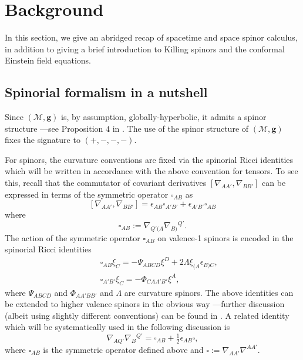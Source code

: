 \documentclass[10pt,a4paper]{article}
\theoremstyle{plain}
\def\bmg{{\bm g}}
\begin{document}
\section{Background}
\label{Background}

In this section, we give an abridged recap of spacetime and space spinor
calculus, in addition to giving a brief introduction to Killing
spinors and the conformal Einstein field equations.

\subsection{Spinorial formalism in a nutshell}
\label{NotationAndSpinorFormalism}

Since $(\mathcal{M}, \bmg)$ is, by assumption, globally-hyperbolic, it
admits a spinor structure ---see Proposition $4$ in
\cite{CFEbook}. The use of the spinor structure of $(\mathcal{M},
\bmg)$ fixes the signature to $(+, -, -, -)$.

\medskip

For spinors, the curvature conventions are fixed via the spinorial
Ricci identities which will be written in accordance with the above
convention for tensors.  To see this, recall that the commutator of
covariant derivatives $[ \nabla_{AA'},\nabla_{BB'}]$ can be expressed
in terms of the symmetric operator $\square_{AB}$ as
\[
[ \nabla_{AA'},\nabla_{BB'}]= \epsilon_{AB}\square_{A'B'} +
\epsilon_{A'B'}\square_{AB}
\]
where
\[
\square_{AB} := \nabla_{Q'(A} \nabla_{B)}{}^{Q'}.
\]
 The action of the symmetric operator $\square_{AB}$ on valence-1
 spinors is encoded in the spinorial Ricci identities
\begin{subequations}
\begin{eqnarray}
&& \square_{AB}\xi_{C}=-\Psi_{ABCD} \xi^{D} +
  2\Lambda\xi_{(A}\epsilon_{B)C},
 \label{SpinorialRicciIdentities1} \\
&& \square_{A'B'}\xi_{C}=-\Phi_{CA A' B'}\xi^{A},
\label{SpinorialRicciIdentities2}
\end{eqnarray}
\end{subequations}
where $\Psi_{ABCD}$ and $\Phi_{AA'BB'}$ and $\Lambda$ are curvature
spinors.  The above identities can be extended to higher valence
spinors in the obvious way ---further discussion (albeit using
slightly different conventions) can be found in \cite{Ste91}. A
related identity which will be systematically used in the following
discussion is
\begin{equation}\label{DecomposeDoubleDerivativeContracted}
\nabla_{AQ'}\nabla_{B}{}^{Q'}=\square_{AB}+
\tfrac{1}{2}\epsilon_{AB}\square,
\end{equation}
where $\square_{AB}$ is the symmetric operator defined above and
$\square := \nabla_{AA'}\nabla^{AA'}.$
\medskip 
\end{document}
